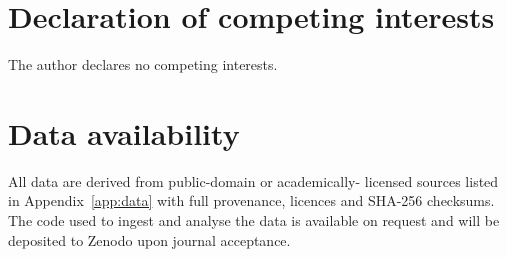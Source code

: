 \section*{Declaration of competing interests}

The author declares no competing interests.

\section*{Data availability}

All data are derived from public-domain or academically-
licensed sources listed in Appendix~\ref{app:data} with full
provenance, licences and SHA-256 checksums. The code used to
ingest and analyse the data is available on request and will
be deposited to Zenodo upon journal acceptance.
